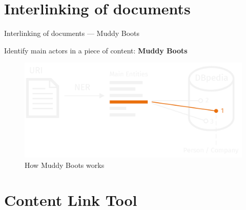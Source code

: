 \documentclass[10pt]{beamer}
\begin{document}
\section{Interlinking of documents}

\begin{frame}[fragile]{Interlinking of documents — Muddy Boots}

  Identify main actors in a piece of content: {\textbf{Muddy Boots}}

  \begin{figure}
    \centering
      \includegraphics[width=.75\textwidth]{img/muddy_boots.png}
    \caption{How Muddy Boots works}
  \end{figure}

\end{frame}


\section{Content Link Tool}
\end{document}
